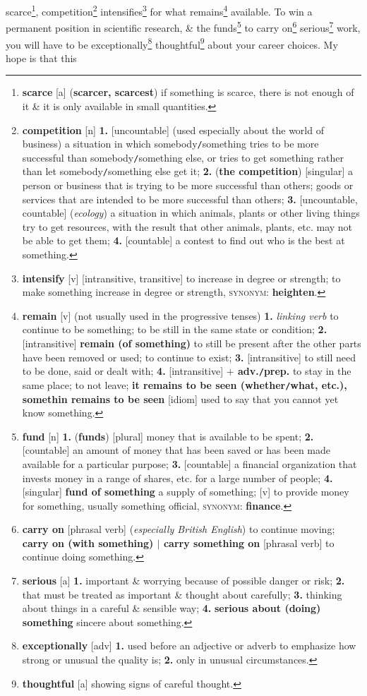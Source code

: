 \documentclass[oneside]{book}
\numberwithin{equation}{section}
\begin{document}
scarce\footnote{\textbf{scarce} [a] (\textbf{scarcer, scarcest}) if something is scarce, there is not enough of it \& it is only available in small quantities.}, competition\footnote{\textbf{competition} [n] \textbf{1.} [uncountable] (used especially about the world of business) a situation in which somebody\texttt{/}something tries to be more successful than somebody\texttt{/}something else, or tries to get something rather than let somebody\texttt{/}something else get it; \textbf{2.} (\textbf{the competition}) [singular] a person or business that is trying to be more successful than others; goods or services that are intended to be more successful than others; \textbf{3.} [uncountable, countable] (\textit{ecology}) a situation in which animals, plants or other living things try to get resources, with the result that other animals, plants, etc. may not be able to get them; \textbf{4.} [countable] a contest to find out who is the best at something.} intensifies\footnote{\textbf{intensify} [v] [intransitive, transitive] to increase in degree or strength; to make something increase in degree or strength, \textsc{synonym}: \textbf{heighten}.} for what remains\footnote{\textbf{remain} [v] (not usually used in the progressive tenses) \textbf{1.} \textit{linking verb} to continue to be something; to be still in the same state or condition; \textbf{2.} [intransitive] \textbf{remain (of something)} to still be present after the other parts have been removed or used; to continue to exist; \textbf{3.} [intransitive] to still need to be done, said or dealt with; \textbf{4.} [intransitive] \textbf{$+$ adv.\texttt{/}prep.} to stay in the same place; to not leave; \textbf{it remains to be seen (whether\texttt{/}what, etc.), somethin remains to be seen} [idiom] used to say that you cannot yet know something.} available. To win a permanent position in scientific research, \& the funds\footnote{\textbf{fund} [n] \textbf{1.} (\textbf{funds}) [plural] money that is available to be spent; \textbf{2.} [countable] an amount of money that has been saved or has been made available for a particular purpose; \textbf{3.} [countable] a financial organization that invests money in a range of shares, etc. for a large number of people; \textbf{4.} [singular] \textbf{fund of something} a supply of something; [v] to provide money for something, usually something official, \textsc{synonym}: \textbf{finance}.} to carry on\footnote{\textbf{carry on} [phrasal verb] (\textit{especially British English}) to continue moving; \textbf{carry on (with something) $|$ carry something on} [phrasal verb] to continue doing something.} serious\footnote{\textbf{serious} [a] \textbf{1.} important \& worrying because of possible danger or risk; \textbf{2.} that must be treated as important \& thought about carefully; \textbf{3.} thinking about things in a careful \& sensible way; \textbf{4.} \textbf{serious about (doing) something} sincere about something.} work, you will have to be exceptionally\footnote{\textbf{exceptionally} [adv] \textbf{1.} used before an adjective or adverb to emphasize how strong or unusual the quality is; \textbf{2.} only in unusual circumstances.} thoughtful\footnote{\textbf{thoughtful} [a] showing signs of careful thought.} about your career choices. My hope is that this 
\end{document}

